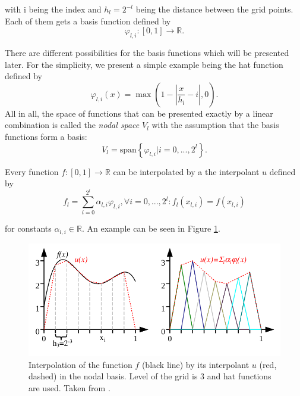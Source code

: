 with i being the index and $ h_l = 2^{-l} $ being the distance between the grid points. Each of them gets a basis function defined by 
\begin{equation}
	\varphi_{l,i}: [0,1] \rightarrow \mathbb{R}.
\end{equation}

There are different possibilities for the basis functions which will be presented later. For the simplicity, we present a simple example being the hat function defined by
\begin{equation}
	\varphi_{l,i}(x) = \max\left(1- \left|\frac{x}{h_l}-i\right|, 0\right).
\end{equation}
All in all, the space of functions that can be presented exactly by a linear combination is called the \textit{nodal space} $V_l$ with the assumption that the basis functions form a basis:
\begin{equation}
	V_l = \text{span}\left\{ \varphi_{l,i} | i = 0,...,2^l\right\}. 
\end{equation}

Every function $f: [0,1] \rightarrow \mathbb{R}$ can be interpolated by a the interpolant $ u $ defined by
\begin{equation}
	f_l = \sum_{i=0}^{2^l}\alpha_{l,i} \varphi_{l,i}, \forall i = 0,...,2^l: f_l(x_{l,i}) = f(x_{l,i})
\end{equation}

for constants $ \alpha_{l,i} \in \mathbb{R} $. An example can be seen in Figure \ref{fig:interpolant}.

\begin{figure}[H]
	\centering
	\includegraphics[scale=0.5]{figures/weighted_sum.png}
	\caption{ Interpolation of the function $ f $ (black line) by its interpolant $ u $ (red, dashed) in the nodal basis. Level of the grid is 3 and hat functions are used. Taken from \cite{pfluger2010spatially}. }
	\label{fig:interpolant}
\end{figure}

